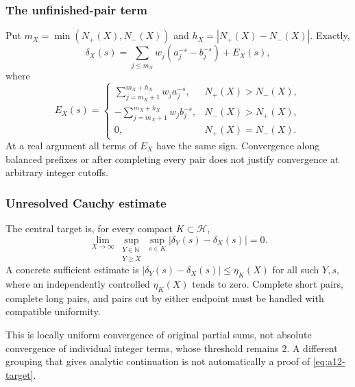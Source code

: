 \subsubsection{The unfinished-pair term}
\label{subsubsec:a12-boundary}
Put $m_X=\min(N_+(X),N_-(X))$ and $h_X=|N_+(X)-N_-(X)|$. Exactly,
\begin{equation}
\label{eq:a12-boundary-split}
\delta_X(s)=\sum_{j\le m_X}w_j(a_j^{-s}-b_j^{-s})+E_X(s),
\end{equation}
where
\begin{equation}
\label{eq:a12-boundary-term}
E_X(s)=
\begin{cases}
\displaystyle\sum_{j=m_X+1}^{m_X+h_X}w_j a_j^{-s},
 &N_+(X)>N_-(X),\\[2mm]
\displaystyle-\sum_{j=m_X+1}^{m_X+h_X}w_j b_j^{-s},
 &N_-(X)>N_+(X),\\
0,&N_+(X)=N_-(X).
\end{cases}
\end{equation}
At a real argument all terms of $E_X$ have the same sign.
Convergence along balanced prefixes or after completing every pair does
not justify convergence at arbitrary integer cutoffs.

\subsubsection{Unresolved Cauchy estimate}
\label{subsubsec:a12-target}
The central target is, for every compact $K\subset\mathcal H$,
\begin{equation}
\label{eq:a12-target}
\boxed{\lim_{X\to\infty}
\sup_{\substack{Y\in\mathbb N\\Y\ge X}}
\sup_{s\in K}|\delta_Y(s)-\delta_X(s)|=0.}
\end{equation}
A concrete sufficient estimate is
$|\delta_Y(s)-\delta_X(s)|\le\eta_K(X)$ for all such $Y,s$, where an
independently controlled $\eta_K(X)$ tends to zero.
Complete short pairs, complete long pairs, and pairs cut by either endpoint
must be handled with compatible uniformity.

This is locally uniform convergence of original partial sums, not absolute
convergence of individual integer terms, whose threshold remains $2$.
A different grouping that gives analytic continuation is not automatically
a proof of \eqref{eq:a12-target}.

